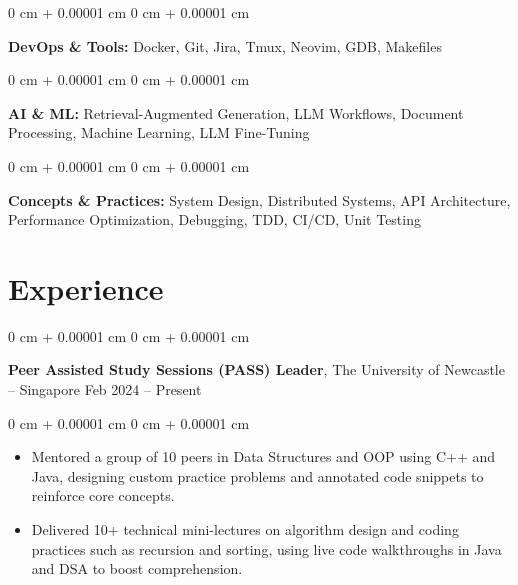 \documentclass[10pt, letterpaper]{article}
\newenvironment{highlights}{
    \begin{itemize}[
        topsep=0.10 cm,
        parsep=0.10 cm,
        partopsep=0pt,
        itemsep=0pt,
        leftmargin=0 cm + 10pt
    ]
}{
    \end{itemize}
} %
\newenvironment{onecolentry}{
    \begin{adjustwidth}{
        0 cm + 0.00001 cm
    }{
        0 cm + 0.00001 cm
    }
}{
    \end{adjustwidth}
} %
\newenvironment{twocolentry}[2][]{
    \onecolentry
    \def\secondColumn{#2}
    \setcolumnwidth{\fill, 4.5 cm}
    \begin{paracol}{2}
}{
    \switchcolumn \raggedleft \secondColumn
    \end{paracol}
    \endonecolentry
} %
\begin{document}
        \vspace{0.1 cm}
        
        \begin{onecolentry}
            \textbf{DevOps \& Tools:} Docker, Git, Jira, Tmux, Neovim, GDB, Makefiles
        \end{onecolentry}
        
        \vspace{0.1 cm}
        
        \begin{onecolentry}
            \textbf{AI \& ML:} Retrieval-Augmented Generation, LLM Workflows, Document Processing, Machine Learning, LLM Fine-Tuning
        \end{onecolentry}
        
        \vspace{0.1 cm}
        
        \begin{onecolentry}
            \textbf{Concepts \& Practices:} System Design, Distributed Systems, API Architecture, Performance Optimization, Debugging, TDD, CI/CD, Unit Testing
        \end{onecolentry}

        \section{Experience}        
                \begin{twocolentry}{
                    Feb 2024 – Present
                }
                    \textbf{Peer Assisted Study Sessions (PASS) Leader}, The University of Newcastle -- Singapore \end{twocolentry}
                \vspace{0.10 cm}
                \begin{onecolentry}
                    \begin{highlights}
                        \item Mentored a group of 10 peers in Data Structures and OOP using C++ and Java, designing custom practice problems and annotated code snippets to reinforce core concepts.
                        \item Delivered 10+ technical mini-lectures on algorithm design and coding practices such as recursion and sorting, using live code walkthroughs in Java and DSA to boost comprehension.
                    \end{highlights}
                \end{onecolentry}
                
\end{document}
